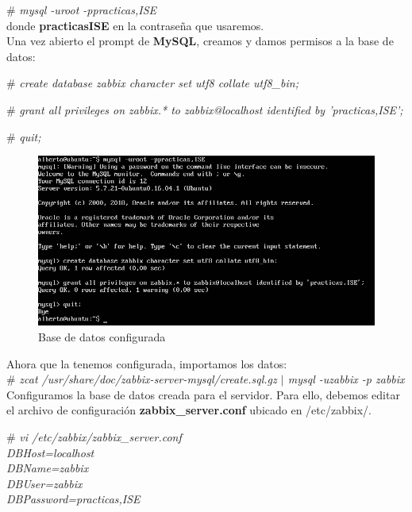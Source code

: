  \# \textit{mysql -uroot -ppracticas,ISE}  \\ 
 donde \textbf{practicasISE} en la contraseña que usaremos. \\
 
 Una vez abierto el prompt de \textbf{MySQL}, creamos y damos permisos a la base de datos:
 
 \# \textit{create database zabbix character set utf8 collate utf8\_bin;} 
 
 \# \textit{grant all privileges on zabbix.* to zabbix@localhost identified by 'practicas,ISE';}  
 
 \# \textit{quit;}  \\ 
 
 \begin{figure}[h]
 	\centering
 	\includegraphics[scale=0.5]{images/bye.png}
 	\caption{Base de datos configurada}
 \end{figure}
 
 
 Ahora que la tenemos configurada, importamos los datos: \\
  \# \textit{zcat /usr/share/doc/zabbix-server-mysql/create.sql.gz $|$ mysql -uzabbix -p zabbix
  	}  \\ 
  
  
\newpage
 Configuramos la base de datos creada para el servidor. Para ello, debemos editar el archivo de configuración \textbf{zabbix\_server.conf} ubicado en /etc/zabbix/. 
 
\# \textit{vi /etc/zabbix/zabbix\_server.conf \\
DBHost=localhost \\
DBName=zabbix \\
DBUser=zabbix \\
DBPassword=practicas,ISE} \\

